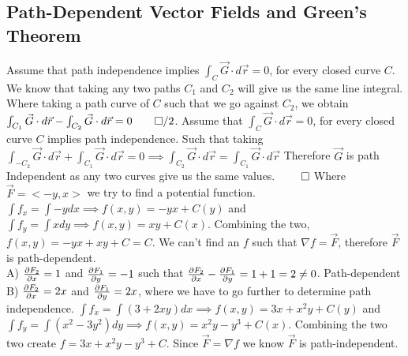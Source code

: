 \documentclass{article}
\begin{document}
\subsection{Path-Dependent Vector Fields and Green's Theorem}
\myproof
Assume that path independence implies $\int_C \vec{G} \cdot d \vec{r}=0$, for every closed curve $C$.
We know that taking any two paths $C_1$ and $C_2$ will give us the same line integral.
Where taking a path curve of $C$ such that we go against $C_2$, we obtain $\int_{C_1} \vec{G} \cdot d \vec{r} - \int_{C_2} \vec{G} \cdot d \vec{r} = 0 \qed/2$.
\double
Assume that $\int_C \vec{G} \cdot d \vec{r}=0$, for every closed curve $C$ implies path independence. 
Such that taking $\int_{-C_2} \vec{G} \cdot d \vec{r} + \int_{C_1} \vec{G} \cdot d \vec{r} = 0 \implies \int_{C_2} \vec{G} \cdot d \vec{r} = \int_{C_1} \vec{G} \cdot d \vec{r}$
Therefore $\vec{G}$ is path Independent as any two curves give us the same values. $\qed$
\sol Where $\vec{F} = <-y,x>$ we try to find a potential function. $\int f_x =\int -y dx \implies f(x,y) = -yx +C(y)$ and $\int f_y = \int x dy \implies f(x,y) = xy + C(x)$.
Combining the two, $f(x,y) = -yx + xy + C = C$. We can't find an $f$ such that $\nabla f = \vec{F}$, therefore $\vec{F}$ is path-dependent.
\sol \\
A) $\frac{\partial F_2}{\partial x} = 1$ and $\frac{\partial F_1}{\partial y} = -1$ such that $\frac{\partial F_2}{\partial x} - \frac{\partial F_1}{\partial y} = 1 + 1 = 2 \ne 0$. Path-dependent \\
B) $\frac{\partial F_2}{\partial x} = 2x$ and $\frac{\partial F_1}{\partial y} = 2x$, where we have to go further to determine path independence.
$\int f_x = \int (3+2xy) dx \implies f(x,y) = 3x+x^2 y + C(y)$ and $\int f_y = \int (x^2-3y^2) dy \implies f(x,y) = x^2 y -y^3 + C(x)$.
Combining the two two create $f = 3x+x^2 y - y^3 + C$. Since $\vec{F} = \nabla f$ we know $\vec{F}$ is path-independent.
\end{document}
